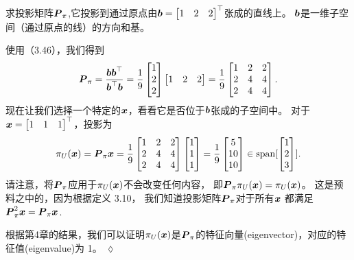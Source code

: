 \begin{example}[投影到一条线上]
    求投影矩阵$\boldsymbol{P}_\pi$,它投影到通过原点由$\boldsymbol{b} = \begin{bmatrix}1 & 2 & 2 \end{bmatrix}^\top$张成的直线上。
    $\boldsymbol{b}$是一维子空间（通过原点的线）的方向和基。

    使用（3.46），我们得到
    \begin{equation}
        \boldsymbol{P}_\pi = \frac{\boldsymbol{b}\boldsymbol{b}^\top}{\boldsymbol{b}^\top\boldsymbol{b}} =
        \frac{1}{9}
        \begin{bmatrix}
            1 \\ 2 \\ 2
        \end{bmatrix}
        \begin{bmatrix}
            1 & 2 & 2
        \end{bmatrix} =
        \frac{1}{9}
        \begin{bmatrix}
            1 & 2 & 2 \\
            2 & 4 & 4 \\
            2 & 4 & 4
        \end{bmatrix}.
    \end{equation}
    现在让我们选择一个特定的$\boldsymbol{x}$，看看它是否位于$\boldsymbol{b}$张成的子空间中。
    对于$\boldsymbol{x} = \begin{bmatrix} 1 & 1 & 1 \end{bmatrix}^\top$，投影为
    \begin{equation}
        \pi_U(\boldsymbol{x}) = \boldsymbol{P}_\pi\boldsymbol{x} =
        \frac{1}{9}
        \begin{bmatrix}
            1 & 2 & 2 \\
            2 & 4 & 4 \\
            2 & 4 & 4
        \end{bmatrix}
        \begin{bmatrix}
            1 \\ 1 \\ 1
        \end{bmatrix} =
        \frac{1}{9}
        \begin{bmatrix}
            5 \\ 10 \\ 10
        \end{bmatrix}
        \in \mathrm{span}[\begin{bmatrix}
            1 \\ 2 \\ 3
        \end{bmatrix}].
    \end{equation}
    请注意，将$\boldsymbol{P}_\pi$应用于$\pi_U (\boldsymbol{x})$不会改变任何内容，
    即$\boldsymbol{P}_\pi \pi_U(\boldsymbol{x}) = \pi_U(\boldsymbol{x})$。
    这是预料之中的，因为根据定义 3.10，
    我们知道投影矩阵$\boldsymbol{P}_\pi$对于所有$\boldsymbol{x}$
    都满足$\boldsymbol{P}^2_\pi \boldsymbol{x} = \boldsymbol{P}_ \pi \boldsymbol{x}$.
\end{example}
\begin{remark}
    根据第4章的结果，我们可以证明$\pi_U(\boldsymbol{x})$是$\boldsymbol{P}_\pi$的特征向量(eigenvector)，对应的特征值(eigenvalue)为 1。
    \hfill $\lozenge$
\end{remark}

